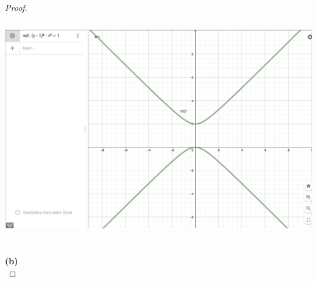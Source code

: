 \documentclass{report}
\begin{document}
\begin{proof}
\includegraphics[height=10cm,width=18cm]{HW3pic1}


\textbf{(b)}\\


\end{proof}
\end{document}
